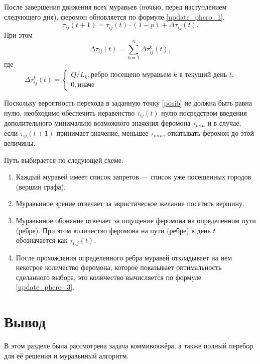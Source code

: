 После завершения движения всех муравьев (ночью, перед наступлением следующего дня), феромон обновляется по формуле \eqref{update_phero_1}.
\begin{equation}
	\label{update_phero_1}
	\tau_{ij}(t+1) = \tau_{ij}(t)\cdot(1-p) + \Delta \tau_{ij}(t).
\end{equation}
При этом
\begin{equation}
	\label{update_phero_2}
	\Delta \tau_{ij}(t) = \sum_{k=1}^N \Delta \tau^k_{ij}(t),
\end{equation}
где
\begin{equation}
	\label{update_phero_3}
	\Delta\tau^k_{ij}(t) = \begin{cases}
		Q/L_{k}, \textrm{ребро посещено муравьем $k$ в текущий день $t$,} \\
		0, \textrm{иначе}
	\end{cases}
\end{equation}

Поскольку вероятность перехода в заданную точку \ref{posib} не должна быть равна нулю, необходимо обеспечить неравенство $\tau_{ij} (t)$ нулю посредством введения дополительного минимально возможного значения феромона $\tau_{min}$ и в случае, если $\tau_{ij} (t+1)$ принимает значение, меньшее $\tau_{min}$, откатывать феромон до этой величины. 


Путь выбирается по следующей схеме.
\begin{enumerate}
	\item Каждый муравей имеет список запретов --- список уже посещенных городов (вершин графа).
	\item Муравьиное зрение отвечает за эвристическое желание посетить вершину.
	\item Муравьиное обоняние отвечает за ощущение феромона на определенном пути (ребре). При этом количество феромона на пути (ребре) в день $t$ обозначается как $\tau_{i, j} (t)$.
	\item После прохождения определенного ребра муравей откладывает на нем некотрое количество феромона, которое показывает оптимальность сделанного выбора, это количество вычисляется по формуле \eqref{update_phero_3}.
\end{enumerate}

\section*{Вывод}
В этом разделе была рассмотрена задача коммивояжёра, а также полный перебор для её решения и муравьиный алгоритм.
\clearpage
